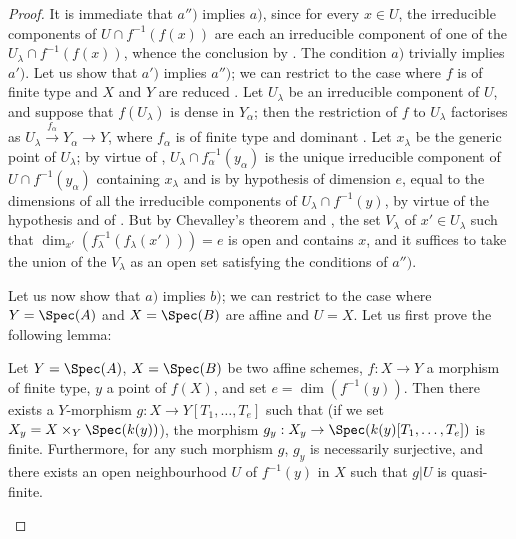 \begin{proof}
It is immediate that $a'')$ implies $a)$, since for every $x\in U$, the irreducible components of $U\cap f^{-1}(f(x))$ are each an irreducible component of one of the $U_\lambda\cap f^{-1}(f(x))$, whence the conclusion by .
The condition $a)$ trivially implies $a')$.
Let us show that $a')$ implies $a'')$; we can restrict to the case where $f$ is of finite type and $X$ and $Y$ are reduced .
Let $U_\lambda$ be an irreducible component of $U$, and suppose that $f(U_\lambda)$ is dense in $Y_\alpha$; then the restriction of $f$ to $U_\lambda$ factorises as $U_\lambda\xrightarrow{f_\alpha}Y_\alpha\longrightarrow Y$, where $f_\alpha$ is of finite type and dominant .
Let $x_\lambda$ be the generic point of $U_\lambda$; by virtue of , $U_\lambda\cap f_\alpha^{-1}(y_\alpha)$ is the unique irreducible component of $U\cap f^{-1}(y_\alpha)$ containing $x_\lambda$ and is by hypothesis of dimension $e$, equal to the dimensions of all the irreducible components of $U_\lambda\cap f^{-1}(y)$, by virtue of the hypothesis and of .
But by Chevalley's theorem  and , the set $V_\lambda$ of $x'\in U_\lambda$ such that $\dim_{x'}(f_\lambda^{-1}(f_\lambda(x')))=e$ is open and contains $x$, and it suffices to take the union of the $V_\lambda$ as an open set satisfying the conditions of $a'')$.

Let us now show that $a)$ implies $b)$; we can restrict to the case where $Y=\Spec(A)$ and $X=\Spec(B)$ are affine and $U=X$.
Let us first prove the following lemma:

\begin{lemma}[13.3.1.1]
\label{IV.13.3.1.1}
Let $Y=\Spec(A)$, $X=\Spec(B)$ be two affine schemes, $f:X\to Y$ a morphism of finite type, $y$ a point of $f(X)$, and set $e=\dim(f^{-1}(y))$.
Then there exists a $Y$-morphism $g:X\to Y[T_1,\ldots,T_e]$ such that (if we set $X_y=X\times_Y\Spec(k(y))$), the morphism $g_y:X_y\to\Spec(k(y)[T_1,\ldots,T_e])$ is finite.
Furthermore, for any such morphism $g$, $g_y$ is necessarily surjective, and there exists an open neighbourhood $U$ of $f^{-1}(y)$ in $X$ such that $g|U$ is quasi-finite.
\end{lemma}


\end{proof}
